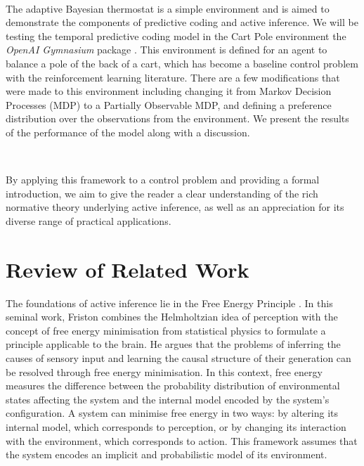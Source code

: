 \documentclass{article}
\begin{document}
\

The adaptive Bayesian thermostat is a simple environment and is aimed to demonstrate the components of predictive coding and active inference. We will be testing the temporal predictive coding model in the Cart Pole environment the \textit{OpenAI Gymnasium} package \citep{towers2024gymnasium}. This environment is defined for an agent to balance a pole of the back of a cart, which has become a baseline control problem with the reinforcement learning literature. There are a few modifications that were made to this environment including changing it from Markov Decision Processes (MDP) to a Partially Observable MDP, and defining a preference distribution over the observations from the environment. We present the results of the performance of the model along with a discussion.

\

By applying this framework to a control problem and providing a formal introduction, we aim to give the reader a clear understanding of the rich normative theory underlying active inference, as well as an appreciation for its diverse range of practical applications.

\section{Review of Related Work}

The foundations of active inference lie in the Free Energy Principle \citep{friston2006free}. In this seminal work, Friston combines the Helmholtzian idea of perception with the concept of free energy minimisation from statistical physics to formulate a principle applicable to the brain. He argues that the problems of inferring the causes of sensory input and learning the causal structure of their generation can be resolved through free energy minimisation. In this context, free energy measures the difference between the probability distribution of environmental states affecting the system and the internal model encoded by the system's configuration. A system can minimise free energy in two ways: by altering its internal model, which corresponds to perception, or by changing its interaction with the environment, which corresponds to action. This framework assumes that the system encodes an implicit and probabilistic model of its environment.

\
\end{document}
